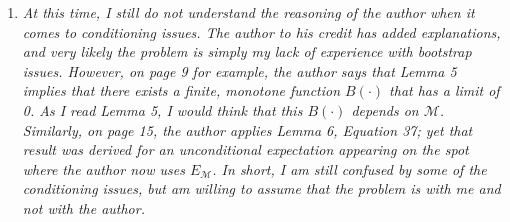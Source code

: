 \documentclass[12pt]{article}
\begin{document}
\begin{enumerate}
\item \textit{At this time, I still do not understand the reasoning of
    the author when it comes to conditioning issues. The author to his
    credit has added explanations, and very likely the problem is
    simply my lack of experience with bootstrap issues. However, on
    page 9 for example, the author says that Lemma 5 implies that
    there exists a finite, monotone function $B(\cdot)$ that has a
    limit of 0. As I read Lemma 5, I would think that this $B(\cdot)$
    depends on $\mathcal{M}$. Similarly, on page 15, the author
    applies Lemma 6, Equation 37; yet that result was derived for an
    unconditional expectation appearing on the spot where the author
    now uses $E_{\mathcal{M}}$. In short, I am still confused by some
    of the conditioning issues, but am willing to assume that the
    problem is with me and not with the author.}

\end{enumerate}
\end{document}
